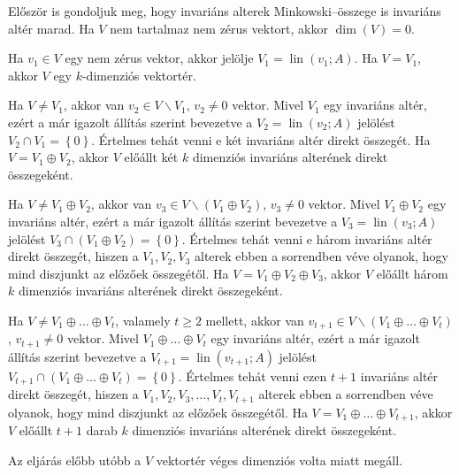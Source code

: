 \documentclass[9pt, a4paper, showtrims]{memoir}
\makeatletter
\renewenvironment{proof}[1][\proofname]
    {\par\pushQED{\qed}%
    \normalfont \topsep6\p@\@plus6\p@\relax
    \trivlist
    \item[\hskip\labelsep
        \itshape
    #1\@addpunct{:}]\ignorespaces}
    {\popQED\endtrivlist\@endpefalse}
\theoremstyle{plain}
\theoremstyle{remark}
\theoremstyle{definition}
\DeclareMathOperator{\lin}{lin}
\makeatother
\begin{document}
\begin{proof}[Bizonyítás (3.)]
	Először is gondoljuk meg, hogy invariáns alterek Minkowski--összege is invariáns altér marad.
	Ha $V$ nem tartalmaz nem zérus vektort, akkor $\dim(V)= 0$.

	Ha $v_1\in V$ egy nem zérus vektor,
	akkor jelölje $V_1=\lin\left( v_1;A \right)$.
	Ha $V=V_1$,
	akkor $V$ egy $k$-dimenziós vektortér.

	Ha $V\neq V_1$, akkor van $v_2\in V\smallsetminus V_1$, $v_2\neq 0$ vektor.
	Mivel $V_1$ egy invariáns altér,
	ezért a már igazolt állítás szerint bevezetve a $V_2=\lin\left( v_2;A \right)$
	jelölést $V_2\cap V_1=\left\{ 0 \right\}$.
	Értelmes tehát venni e két invariáns altér direkt összegét.
	Ha $V=V_1\oplus V_2$, akkor $V$ előállt két $k$ dimenziós invariáns alterének direkt összegeként.

	Ha $V\neq V_1\oplus V_2$, akkor van $v_3\in V\smallsetminus (V_1\oplus V_2)$, $v_3\neq 0$ vektor.
	Mivel $V_1\oplus V_2$ egy invariáns altér,
	ezért a már igazolt állítás szerint bevezetve a $V_3=\lin\left( v_3;A \right)$
	jelölést $V_3\cap (V_1\oplus V_2)=\left\{ 0 \right\}$.
	Értelmes tehát venni e három invariáns altér direkt összegét, hiszen
	a $V_1,V_2,V_3$ alterek ebben a sorrendben véve olyanok,
	hogy mind diszjunkt az előzőek összegétől.
	Ha $V=V_1\oplus V_2\oplus V_3$,
	akkor $V$ előállt három $k$ dimenziós invariáns alterének direkt összegeként.

	Ha $V\neq V_1\oplus\dots\oplus V_t$, valamely $t\geq 2$ mellett,
    akkor van $v_{t+1}\in V\smallsetminus (V_1\oplus\dots\oplus V_t)$, $v_{t+1}\neq 0$ vektor.
	Mivel $V_1\oplus\dots\oplus V_t$ egy invariáns altér,
	ezért a már igazolt állítás szerint bevezetve a $V_{t+1}=\lin\left( v_{t+1};A \right)$
	jelölést $V_{t+1}\cap (V_1\oplus\dots\oplus V_t)=\left\{ 0 \right\}$.
	Értelmes tehát venni ezen $t+1$ invariáns altér direkt összegét, hiszen
	a $V_1,V_2,V_3,\ldots,V_t,V_{t+1}$ alterek ebben a sorrendben véve olyanok,
	hogy mind diszjunkt az előzőek összegétől.
	Ha $V=V_1\oplus\dots\oplus V_{t+1}$,
	akkor $V$ előállt $t+1$ darab $k$ dimenziós invariáns alterének direkt összegeként.

	Az eljárás előbb utóbb a $V$ vektortér véges dimenziós volta miatt megáll.
\end{proof}
\end{document}
